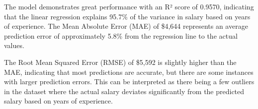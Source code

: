 The model demonstrates great performance with an R² score of 0.9570, indicating that the linear regression explains 95.7\% of the variance in salary based on years of experience. 
The Mean Absolute Error (MAE) of \$4,644 represents an average prediction error of approximately 5.8\% from the regression line to the actual values.

The Root Mean Squared Error (RMSE) of \$5,592 is slightly higher than the MAE, indicating that most predictions are accurate, but there are some instances with larger prediction errors. 
This can be interpreted as there being a few outliers in the dataset where the actual salary deviates significantly from the predicted salary based on years of experience.